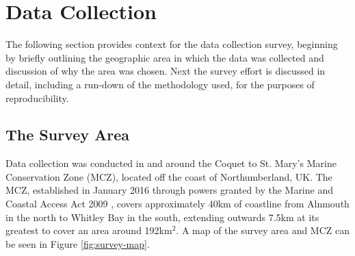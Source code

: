 \section{Data Collection}\label{ch:NDD,sec:dataCollection}

The following section provides context for the data collection survey, beginning by briefly outlining the geographic area in which the data was collected and discussion of why the area was chosen. Next the survey effort is discussed in detail, including a run-down of the methodology used, for the purposes of reproducibility. 

\subsection{The Survey Area}\label{ch:NDD,sec:dataCollection,sub:surveyArea}

Data collection was conducted in and around the Coquet to St. Mary's Marine Conservation Zone (MCZ), located off the coast of Northumberland, UK. The MCZ, established in January 2016 through powers granted by the Marine and Coastal Access Act 2009 \cite{noauthor_marine_2009}, covers approximately 40km of coastline from Alnmouth in the north to Whitley Bay in the south, extending outwards 7.5km at its greatest to cover an area around 192km$^{2}$. A map of the survey area and MCZ can be seen in Figure \ref{fig:survey-map}.

